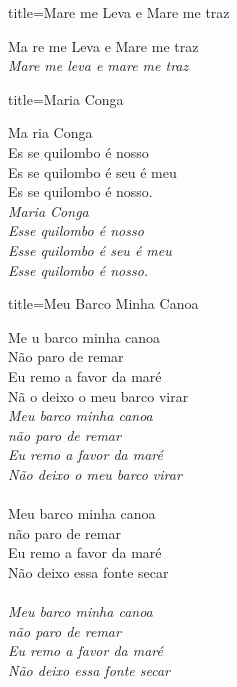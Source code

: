 \documentclass[fontsize=14pt, paper=a4, twoside, DIV=20]{scrreprt} %
\begin{document}
\begin{multicols*}{2}
\begin{song}{title={Mare me Leva e Mare me traz}}
        \begin{verse*}
            Ma re me Leva e Mare me traz\\
            \textit{Mare me leva e mare me traz}\\
        \end{verse*}
\end{song}

\begin{song}{title={Maria Conga}}
        \begin{verse*}
            Ma ria Conga\\
            Es se quilombo é nosso\\
            Es se quilombo é seu é meu\\
            Es se quilombo é nosso.\\
            \textit{Maria Conga}\\
            \textit{Esse quilombo é nosso}\\
            \textit{Esse quilombo é seu é meu}\\
            \textit{Esse quilombo é nosso.}\\
        \end{verse*}
\end{song}

\begin{song}{title={Meu Barco Minha Canoa}}
        \begin{verse*}
            Me u barco minha canoa\\
            Não paro de remar\\
            Eu remo a favor da maré\\
            Nã o deixo o meu barco virar\\

            \textit{Meu barco minha canoa }\\
            \textit{não paro de remar}\\
            \textit{Eu remo a favor da maré}\\
            \textit{Não deixo o meu barco virar}\\
            \\
            Meu barco minha canoa\\
            não paro de remar\\
            Eu remo a favor da maré\\
            Não deixo essa fonte secar\\
            \\
            \textit{Meu barco minha canoa }\\
            \textit{não paro de remar}\\
            \textit{Eu remo a favor da maré}\\
            \textit{Não deixo essa fonte secar}\\


\end{verse*}
\end{song}
\end{multicols*}
\end{document}
